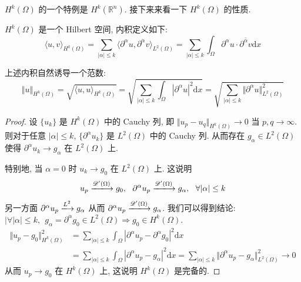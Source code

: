 \documentclass[11pt]{ctexart}[UTF8]
\begin{document}
$H^{k}(\Omega)$ 的一个特例是 $H^{k}(\mathbb{R}^{n})$. 接下来来看一下 $H^{k}(\Omega)$ 的性质.
\begin{property}
    $H^{k}(\Omega)$ 是一个 Hilbert 空间, 内积定义如下:
    \begin{equation*}
        \langle u,v \rangle_{H^{k}(\Omega)} = \sum_{|\alpha| \leq k} \langle \partial^{\alpha}u, \partial^{\alpha}v \rangle_{L^{2}(\Omega)} = \sum_{|\alpha| \leq k} \int_{\Omega} \partial^{\alpha}u \cdot \overline{\partial^{\alpha}v} \mathrm{d}x
    \end{equation*}
\end{property}
\begin{remark}
    上述内积自然诱导一个范数:
    \begin{equation*}
        \Vert u \Vert_{H^{k}(\Omega)} = \sqrt{\langle u,u \rangle_{H^{k}(\Omega)}} = \sqrt{\sum_{|\alpha| \leq k} \int_{\Omega} |\partial^{\alpha}u|^2 \mathrm{d}x} = \sqrt{\sum_{|\alpha| \leq k} \Vert \partial^{\alpha}u \Vert_{L^{2}(\Omega)}^2}
    \end{equation*}
\end{remark}
\begin{proof}
    设 $\{ u_{k} \}$ 是 $H^{k}(\Omega)$ 中的 Cauchy 列, 即 $\Vert u_{p}-u_{q} \Vert_{H^{k}(\Omega)} \to 0$ 当 $p,q \to \infty$. 
    则对于任意 $|\alpha| \leq k$, $\{ \partial^{\alpha}u_{k} \}$ 是 $L^{2}(\Omega)$ 中的 Cauchy 列. 从而存在 $g_{\alpha} \in L^{2}(\Omega)$ 使得 
    $\partial^{\alpha}u_{k} \to g_{\alpha}$ 在 $L^{2}(\Omega)$ 上.\par
    特别地, 当 $\alpha = 0$ 时 $u_{k} \to g_{0}$ 在 $L^{2}(\Omega)$ 上. 这说明
    \begin{equation*}
        u_{p} \xlongrightarrow{\mathscr{D}'(\Omega)} g_{0},\ \ \partial^{\alpha}u_{p} \xlongrightarrow{\mathscr{D}'(\Omega)} g_{\alpha},\ \ \forall |\alpha| \leq k
    \end{equation*}
    另一方面 $\partial^{\alpha}u_{p} \xlongrightarrow{L^{2}}g_{\alpha}$ 从而 $\partial^{\alpha}u_{p} \xlongrightarrow{\mathscr{D}'(\Omega)} g_{\alpha}$. 
    我们可以得到结论: $|\forall|\alpha| \leq k,\ \ g_{\alpha} = \partial^{\alpha}g_{0} \in L^{2}(\Omega) \Longrightarrow g_{0} \in H^{k}(\Omega)$.
    \begin{equation*}
        \begin{aligned}
            \Vert u_{p} - g_{0} \Vert_{H^{k}(\Omega)}^2 &= \sum_{|\alpha| \leq k} \int_{\Omega} |\partial^{\alpha}u_{p} - \partial^{\alpha}g_{0}|^2 \mathrm{d}x\\
            &= \sum_{|\alpha| \leq k} \int_{\Omega} |\partial^{\alpha}u_{p} - g_{\alpha}|^2 \mathrm{d}x = \sum_{|\alpha| \leq k} \Vert \partial^{\alpha}u_{p} - g_{\alpha} \Vert_{L^{2}(\Omega)}^2 \to 0
        \end{aligned}
    \end{equation*}
    从而 $u_{p} \to g_{0}$ 在 $H^{k}(\Omega)$ 上, 这说明 $H^{k}(\Omega)$ 是完备的.
\end{proof}
\end{document}
